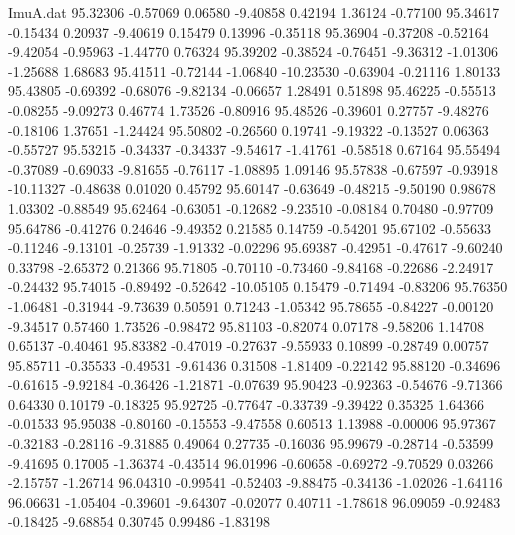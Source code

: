 \begin{filecontents}{ImuA.dat}
  95.32306   -0.57069    0.06580   -9.40858    0.42194    1.36124   -0.77100
  95.34617   -0.15434    0.20937   -9.40619    0.15479    0.13996   -0.35118
  95.36904   -0.37208   -0.52164   -9.42054   -0.95963   -1.44770    0.76324
  95.39202   -0.38524   -0.76451   -9.36312   -1.01306   -1.25688    1.68683
  95.41511   -0.72144   -1.06840  -10.23530   -0.63904   -0.21116    1.80133
  95.43805   -0.69392   -0.68076   -9.82134   -0.06657    1.28491    0.51898
  95.46225   -0.55513   -0.08255   -9.09273    0.46774    1.73526   -0.80916
  95.48526   -0.39601    0.27757   -9.48276   -0.18106    1.37651   -1.24424
  95.50802   -0.26560    0.19741   -9.19322   -0.13527    0.06363   -0.55727
  95.53215   -0.34337   -0.34337   -9.54617   -1.41761   -0.58518    0.67164
  95.55494   -0.37089   -0.69033   -9.81655   -0.76117   -1.08895    1.09146
  95.57838   -0.67597   -0.93918  -10.11327   -0.48638    0.01020    0.45792
  95.60147   -0.63649   -0.48215   -9.50190    0.98678    1.03302   -0.88549
  95.62464   -0.63051   -0.12682   -9.23510   -0.08184    0.70480   -0.97709
  95.64786   -0.41276    0.24646   -9.49352    0.21585    0.14759   -0.54201
  95.67102   -0.55633   -0.11246   -9.13101   -0.25739   -1.91332   -0.02296
  95.69387   -0.42951   -0.47617   -9.60240    0.33798   -2.65372    0.21366
  95.71805   -0.70110   -0.73460   -9.84168   -0.22686   -2.24917   -0.24432
  95.74015   -0.89492   -0.52642  -10.05105    0.15479   -0.71494   -0.83206
  95.76350   -1.06481   -0.31944   -9.73639    0.50591    0.71243   -1.05342
  95.78655   -0.84227   -0.00120   -9.34517    0.57460    1.73526   -0.98472
  95.81103   -0.82074    0.07178   -9.58206    1.14708    0.65137   -0.40461
  95.83382   -0.47019   -0.27637   -9.55933    0.10899   -0.28749    0.00757
  95.85711   -0.35533   -0.49531   -9.61436    0.31508   -1.81409   -0.22142
  95.88120   -0.34696   -0.61615   -9.92184   -0.36426   -1.21871   -0.07639
  95.90423   -0.92363   -0.54676   -9.71366    0.64330    0.10179   -0.18325
  95.92725   -0.77647   -0.33739   -9.39422    0.35325    1.64366   -0.01533
  95.95038   -0.80160   -0.15553   -9.47558    0.60513    1.13988   -0.00006
  95.97367   -0.32183   -0.28116   -9.31885    0.49064    0.27735   -0.16036
  95.99679   -0.28714   -0.53599   -9.41695    0.17005   -1.36374   -0.43514
  96.01996   -0.60658   -0.69272   -9.70529    0.03266   -2.15757   -1.26714
  96.04310   -0.99541   -0.52403   -9.88475   -0.34136   -1.02026   -1.64116
  96.06631   -1.05404   -0.39601   -9.64307   -0.02077    0.40711   -1.78618
  96.09059   -0.92483   -0.18425   -9.68854    0.30745    0.99486   -1.83198

\end{filecontents}
